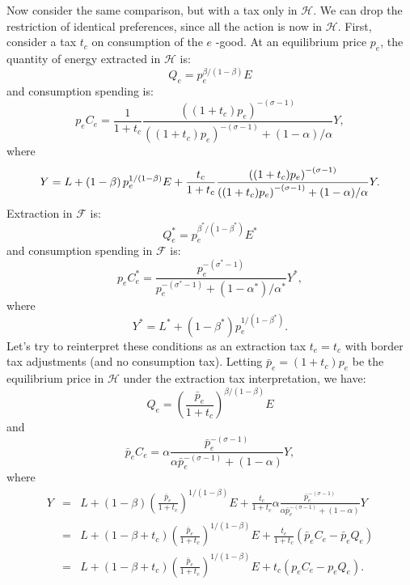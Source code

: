 \documentclass[notitlepage,12pt]{article}
\begin{document}
Now consider the same comparison, but with a tax only in $\mathcal{H}$. We
can drop the restriction of identical preferences, since all the action is
now in $\mathcal{H}$. First, consider a tax $t_{c}$ on consumption of the $e$%
-good. At an equilibrium price $p_{e}$, the quantity of energy extracted in $%
\mathcal{H}$ is:%
\begin{equation*}
Q_{e}=p_{e}^{\beta /(1-\beta )}E
\end{equation*}%
and consumption spending is:%
\begin{equation*}
p_{e}C_{e}=\frac{1}{1+t_{c}}\frac{\left( (1+t_{c})p_{e}\right) ^{-(\sigma
-1)}}{\left( (1+t_{c})p_{e}\right) ^{-(\sigma -1)}+(1-\alpha )/\alpha }Y,
\end{equation*}%
where%
\begin{equation*}
Y=L+\left( 1-\beta \right) p_{e}^{1/(1-\beta )}E+\frac{t_{c}}{1+t_{c}}\frac{%
\left( (1+t_{c})p_{e}\right) ^{-(\sigma -1)}}{\left( (1+t_{c})p_{e}\right)
^{-(\sigma -1)}+(1-\alpha )/\alpha }Y.
\end{equation*}%
Extraction in $\mathcal{F}$ is:%
\begin{equation*}
Q_{e}^{\ast }=p_{e}^{\beta ^{\ast }/(1-\beta ^{\ast })}E^{\ast }
\end{equation*}%
and consumption spending in $\mathcal{F}$ is:%
\begin{equation*}
p_{e}C_{e}^{\ast }=\frac{p_{e}^{-(\sigma ^{\ast }-1)}}{p_{e}^{-(\sigma
^{\ast }-1)}+(1-\alpha ^{\ast })/\alpha ^{\ast }}Y^{\ast },
\end{equation*}%
where%
\begin{equation*}
Y^{\ast }=L^{\ast }+\left( 1-\beta ^{\ast }\right) p_{e}^{1/(1-\beta ^{\ast
})}.
\end{equation*}%
Let's try to reinterpret these conditions as an extraction tax $t_{e}=t_{c}$
with border tax adjustments (and no consumption tax). Letting $\bar{p}%
_{e}=(1+t_{c})p_{e}$ be the equilibrium price in $\mathcal{H}$ under the
extraction tax interpretation, we have:%
\begin{equation*}
Q_{e}=\left( \frac{\bar{p}_{e}}{1+t_{c}}\right) ^{\beta /(1-\beta )}E
\end{equation*}%
and%
\begin{equation*}
\bar{p}_{e}C_{e}=\alpha \frac{\bar{p}_{e}^{-(\sigma -1)}}{\alpha \bar{p}%
_{e}^{-(\sigma -1)}+(1-\alpha )}Y,
\end{equation*}%
where%
\begin{eqnarray*}
Y &=&L+\left( 1-\beta \right) \left( \frac{\bar{p}_{e}}{1+t_{c}}\right)
^{1/(1-\beta )}E+\frac{t_{c}}{1+t_{c}}\alpha \frac{\bar{p}_{e}^{-(\sigma -1)}%
}{\alpha \bar{p}_{e}^{-(\sigma -1)}+(1-\alpha )}Y \\
&=&L+\left( 1-\beta +t_{c}\right) \left( \frac{\bar{p}_{e}}{1+t_{c}}\right)
^{1/(1-\beta )}E+\frac{t_{c}}{1+t_{c}}\left( \bar{p}_{e}C_{e}-\bar{p}%
_{e}Q_{e}\right) \\
&=&L+\left( 1-\beta +t_{c}\right) \left( \frac{\bar{p}_{e}}{1+t_{c}}\right)
^{1/(1-\beta )}E+t_{c}\left( p_{e}C_{e}-p_{e}Q_{e}\right) .
\end{eqnarray*}%
\end{document}
